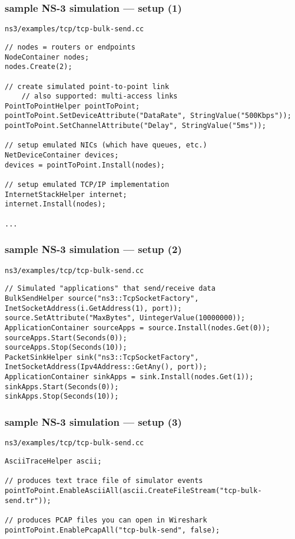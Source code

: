\begin{FragileFrame}
\frametitle{sample NS-3 simulation --- setup (1)}
{\scriptsize \texttt{ns3/examples/tcp/tcp-bulk-send.cc}}
\begin{Verbatim}[fontsize=\fontsize{9}{10}]
// nodes = routers or endpoints
NodeContainer nodes;
nodes.Create(2);

// create simulated point-to-point link
    // also supported: multi-access links
PointToPointHelper pointToPoint;
pointToPoint.SetDeviceAttribute("DataRate", StringValue("500Kbps"));
pointToPoint.SetChannelAttribute("Delay", StringValue("5ms"));

// setup emulated NICs (which have queues, etc.)
NetDeviceContainer devices;
devices = pointToPoint.Install(nodes);

// setup emulated TCP/IP implementation
InternetStackHelper internet;
internet.Install(nodes);

...
\end{Verbatim}
\end{FragileFrame}

\begin{FragileFrame}
\frametitle{sample  NS-3 simulation --- setup (2)}
{\scriptsize \texttt{ns3/examples/tcp/tcp-bulk-send.cc}}
\begin{Verbatim}[fontsize=\fontsize{9}{10}]
// Simulated "applications" that send/receive data
BulkSendHelper source("ns3::TcpSocketFactory", InetSocketAddress(i.GetAddress(1), port));
source.SetAttribute("MaxBytes", UintegerValue(10000000));
ApplicationContainer sourceApps = source.Install(nodes.Get(0));
sourceApps.Start(Seconds(0));
sourceApps.Stop(Seconds(10));
PacketSinkHelper sink("ns3::TcpSocketFactory", InetSocketAddress(Ipv4Address::GetAny(), port));
ApplicationContainer sinkApps = sink.Install(nodes.Get(1));
sinkApps.Start(Seconds(0));
sinkApps.Stop(Seconds(10));
\end{Verbatim}
\end{FragileFrame}

\begin{FragileFrame}
\frametitle{sample NS-3 simulation --- setup (3)}
{\scriptsize \texttt{ns3/examples/tcp/tcp-bulk-send.cc}}
\begin{Verbatim}[fontsize=\fontsize{9}{10}]
AsciiTraceHelper ascii;

// produces text trace file of simulator events
pointToPoint.EnableAsciiAll(ascii.CreateFileStream("tcp-bulk-send.tr"));

// produces PCAP files you can open in Wireshark
pointToPoint.EnablePcapAll("tcp-bulk-send", false);
\end{Verbatim}
\end{FragileFrame}

